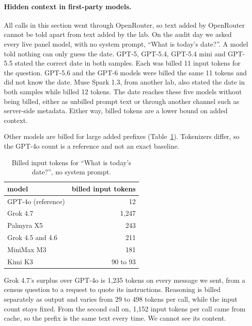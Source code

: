 \documentclass[11pt]{article}
\begin{document}
\paragraph{Hidden context in first-party models.} All calls in this section went through
OpenRouter, so text added by OpenRouter cannot be told apart from text added by the lab. On the
audit day we asked every live panel model, with no system prompt, ``What is today's date?''. A
model told nothing can only guess the date. GPT-5, GPT-5.4, GPT-5.4 mini and GPT-5.5 stated the
correct date in both samples. Each was billed 11 input tokens for the question. GPT-5.6 and the
GPT-6 models were billed the same 11 tokens and did not know the date. Muse Spark 1.3, from
another lab, also stated the date in both samples while billed 12 tokens. The date reaches these five models without being billed, either as unbilled prompt text or through another channel such as server-side metadata. Either way, billed tokens are a
lower bound on added context.

Other models are billed for large added prefixes (Table~\ref{tab:billed}). Tokenizers differ, so
the GPT-4o count is a reference and not an exact baseline.

\begin{table}[h]
\centering\small
\begin{tabular}{lr}
\toprule
model & billed input tokens \\
\midrule
GPT-4o (reference) & 12 \\
Grok 4.7 & 1,247 \\
Palmyra X5 & 243 \\
Grok 4.5 and 4.6 & 211 \\
MiniMax M3 & 181 \\
Kimi K3 & 90 to 93 \\
\bottomrule
\end{tabular}
\caption{Billed input tokens for ``What is today's date?'', no system prompt.}
\label{tab:billed}
\end{table}

Grok 4.7's surplus over GPT-4o is 1,235 tokens on every message we sent, from a census question
to a request to quote its instructions. Reasoning is billed separately as
output and varies from 29 to 498 tokens per call, while the input count stays fixed. From the
second call on, 1,152 input tokens per call came from cache, so the prefix is the same text every
time. We cannot see its content. 
\end{document}
